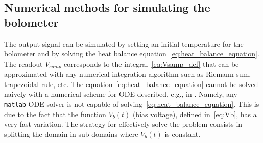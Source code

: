 \subsection{Numerical methods for simulating the bolometer}
The output signal can be simulated by setting an initial temperature for the bolometer and by solving the heat balance equation~\eqref{eq:heat_balance_equation}. The readout $V_{samp}$ corresponds to the integral~\eqref{eq:Vsamp_def} that can be approximated with any numerical integration algorithm such as Riemann sum, trapezoidal rule, etc. The equation~\eqref{eq:heat_balance_equation} cannot be solved naively with a numerical scheme for ODE described, e.g., in \cite{mattheij1996ordinary,ascher1998computer}. Namely, any \texttt{matlab} ODE solver is not capable of solving~\eqref{eq:heat_balance_equation}. This is due to the fact that the function $V_b(t)$ (bias voltage), defined in~\eqref{eq:Vb}, has a very fast variation. The strategy for effectively solve the problem consists in splitting the domain in sub-domains where $V_b(t)$ is constant. 

